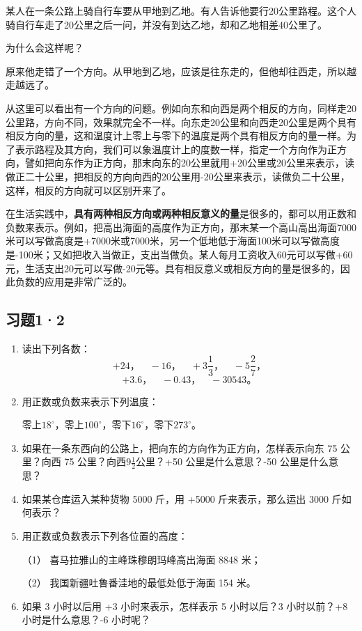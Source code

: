 某人在一条公路上骑自行车要从甲地到乙地。有人告诉他要行20公里路程。这个人骑自行车走了20公里之后一问，并没有到达乙地，却和乙地相差40公里了。

为什么会这样呢？

原来他走错了一个方向。从甲地到乙地，应该是往东走的，但他却往西走，所以越走越远了。

从这里可以看出有一个方向的问题。例如向东和向西是两个相反的方向，同样走20公里路，方向不同，效果就完全不一样。向东走20公里和向西走20公里是两个具有相反方向的量，这和温度计上零上与零下的温度是两个具有相反方向的量一样。为了表示路程及其方向，我们可以象温度计上的度数一样，指定一个方向作为正方向，譬如把向东作为正方向，那末向东的20公里就用+20公里或20公里来表示，读做正二十公里，把相反的方向向西的20公里用-20公里来表示，读做负二十公里，这样，相反的方向就可以区别开来了。

在生活实践中，\textbf{具有两种相反方向或两种相反意义的量}是很多的，都可以用正数和负数来表示。例如，把高出海面的高度作为正方向，那末某一个高山高出海面7000米可以写做高度是+7000米或7000米，另一个低地低于海面100米可以写做高度是-100米；又如把收入当做正，支出当做负。某人每月工资收入60元可以写做+60元，生活支出20元可以写做-20元等。具有相反意义或相反方向的量是很多的，因此负数的应用是非常广泛的。

\subsection{习题1·2}

\begin{enumerate}
\item
  读出下列各数：
  \[
  + 24\text{，}\quad - 16\text{，}\quad + 3 \frac{1}{3}\text{，}\quad - 5 \frac{2}{7}\text{，}
  \]
  \[
  + 3.6\text{，}\quad - 0.43\text{，}\quad - 30543\text{。}
  \]
\item
  用正数或负数来表示下列温度：

  零上\(18^{\circ}\)，零上\(100^{\circ}\)，零下\(16^{\circ}\)，零下\(273^{\circ}\)。
\item
  如果在一条东西向的公路上，把向东的方向作为正方向，怎样表示向东 75 公里？向西 75 公里？向西\(9 \frac{1}{2}\)公里？+50 公里是什么意思？-50 公里是什么意思？
\item
  如果某仓库运入某种货物 5000 斤，用 +5000 斤来表示，那么运出 3000 斤如何表示？
\item
  用正数或负数表示下列各位置的高度：

  （1） 喜马拉雅山的主峰珠穆朗玛峰高出海面 8848 米；

  （2） 我国新疆吐鲁番洼地的最低处低于海面 154 米。
\item
  如果 3 小时以后用 +3 小时来表示，怎样表示 5 小时以后？3 小时以前？+8 小时是什么意思？-6 小时呢？
\end{enumerate}

